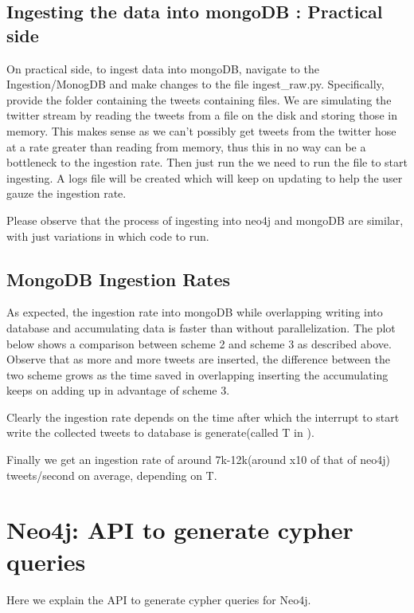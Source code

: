 \documentclass[letterpaper,10pt,english]{sphinxmanual}
\begin{document}
\section{Ingesting the data into mongoDB : Practical side}
\label{\detokenize{mongoDB_data_ingestion:ingesting-the-data-into-mongodb-practical-side}}
On practical side, to ingest data into mongoDB, navigate to the Ingestion/MonogDB and make changes to the file ingest\_raw.py. Specifically, provide the folder containing the tweets containing files. We are simulating the twitter stream by reading the tweets from a file on the disk and storing those in memory. This makes sense as we can’t possibly get tweets from the twitter hose at a rate greater than reading from memory, thus this in no way can be a bottleneck to the ingestion rate. Then just run the we need to run the file  to start ingesting. A logs file will be created which will keep on updating to help the user gauze the ingestion rate.

Please observe that the process of ingesting into neo4j and mongoDB are similar, with just variations in which code to run.


\section{MongoDB Ingestion Rates}
\label{\detokenize{mongoDB_data_ingestion:mongodb-ingestion-rates}}
As expected, the ingestion rate into mongoDB while overlapping writing into database and accumulating data is faster than without parallelization. The plot below shows a comparison between scheme 2 and scheme 3 as described above. Observe that as more and more tweets are inserted, the difference between the two scheme grows as the time saved in overlapping inserting the accumulating keeps on adding up in advantage of scheme 3.

\noindent{}

Clearly the ingestion rate depends on the time after which the interrupt to start write the collected tweets to database is generate(called T in {\hyperref[\detokenize{mongoDB_data_ingestion:improving-ingestion-rate-using-parallel-multiple-process}]{}}).

Finally we get an ingestion rate of around 7k-12k(around x10 of that of neo4j) tweets/second on average, depending on T.


\chapter{Neo4j: API to generate cypher queries}
\label{\detokenize{neo4j_query_generation:neo4j-api-to-generate-cypher-queries}}\label{\detokenize{neo4j_query_generation::doc}}
Here we explain the API to generate cypher queries for Neo4j.
\end{document}
